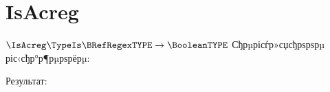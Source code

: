 \section{IsAcreg}
\begin{frame}{$\IsAcreg\TypeIs\BRefRegexTYPE\to\BooleanTYPE$}
	Сђрµрісѓр»сџсђрѕрѕрµ ріс‹сђр°р¶рµрѕрёрµ:

	Результат:
\end{frame}